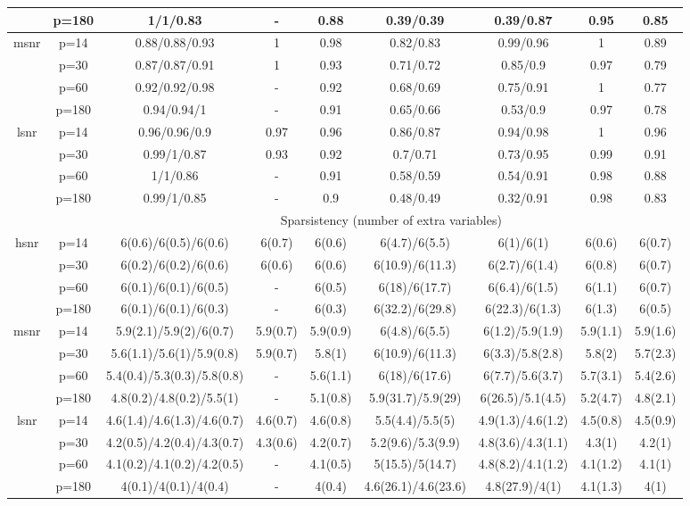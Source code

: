 \begin{table}[ht]
{\begin{tabular}{|c|c|ccccccc|}
   & p=180 & 1/1/0.83 & - & 0.88 & 0.39/0.39 & 0.39/0.87 & 0.95 & 0.85 \\ 
  \midrule\multirow{4}[2]{*}{msnr} & p=14 & 0.88/0.88/0.93 & 1 & 0.98 & 0.82/0.83 & 0.99/0.96 & 1 & 0.89 \\ 
   & p=30 & 0.87/0.87/0.91 & 1 & 0.93 & 0.71/0.72 & 0.85/0.9 & 0.97 & 0.79 \\ 
   & p=60 & 0.92/0.92/0.98 & - & 0.92 & 0.68/0.69 & 0.75/0.91 & 1 & 0.77 \\ 
   & p=180 & 0.94/0.94/1 & - & 0.91 & 0.65/0.66 & 0.53/0.9 & 0.97 & 0.78 \\ 
  \midrule\multirow{4}[2]{*}{lsnr} & p=14 & 0.96/0.96/0.9 & 0.97 & 0.96 & 0.86/0.87 & 0.94/0.98 & 1 & 0.96 \\ 
   & p=30 & 0.99/1/0.87 & 0.93 & 0.92 & 0.7/0.71 & 0.73/0.95 & 0.99 & 0.91 \\ 
   & p=60 & 1/1/0.86 & - & 0.91 & 0.58/0.59 & 0.54/0.91 & 0.98 & 0.88 \\ 
   & p=180 & 0.99/1/0.85 & - & 0.9 & 0.48/0.49 & 0.32/0.91 & 0.98 & 0.83 \\ 
   \midrule 
 \multicolumn{1}{|c}{} &       & \multicolumn{7}{c|}{Sparsistency (number of extra variables)} \\
\midrule\multirow{4}[2]{*}{hsnr} & p=14 & 6(0.6)/6(0.5)/6(0.6) & 6(0.7) & 6(0.6) & 6(4.7)/6(5.5) & 6(1)/6(1) & 6(0.6) & 6(0.7) \\ 
   & p=30 & 6(0.2)/6(0.2)/6(0.6) & 6(0.6) & 6(0.6) & 6(10.9)/6(11.3) & 6(2.7)/6(1.4) & 6(0.8) & 6(0.7) \\ 
   & p=60 & 6(0.1)/6(0.1)/6(0.5) & - & 6(0.5) & 6(18)/6(17.7) & 6(6.4)/6(1.5) & 6(1.1) & 6(0.7) \\ 
   & p=180 & 6(0.1)/6(0.1)/6(0.3) & - & 6(0.3) & 6(32.2)/6(29.8) & 6(22.3)/6(1.3) & 6(1.3) & 6(0.5) \\ 
  \midrule\multirow{4}[2]{*}{msnr} & p=14 & 5.9(2.1)/5.9(2)/6(0.7) & 5.9(0.7) & 5.9(0.9) & 6(4.8)/6(5.5) & 6(1.2)/5.9(1.9) & 5.9(1.1) & 5.9(1.6) \\ 
   & p=30 & 5.6(1.1)/5.6(1)/5.9(0.8) & 5.9(0.7) & 5.8(1) & 6(10.9)/6(11.3) & 6(3.3)/5.8(2.8) & 5.8(2) & 5.7(2.3) \\ 
   & p=60 & 5.4(0.4)/5.3(0.3)/5.8(0.8) & - & 5.6(1.1) & 6(18)/6(17.6) & 6(7.7)/5.6(3.7) & 5.7(3.1) & 5.4(2.6) \\ 
   & p=180 & 4.8(0.2)/4.8(0.2)/5.5(1) & - & 5.1(0.8) & 5.9(31.7)/5.9(29) & 6(26.5)/5.1(4.5) & 5.2(4.7) & 4.8(2.1) \\ 
  \midrule\multirow{4}[2]{*}{lsnr} & p=14 & 4.6(1.4)/4.6(1.3)/4.6(0.7) & 4.6(0.7) & 4.6(0.8) & 5.5(4.4)/5.5(5) & 4.9(1.3)/4.6(1.2) & 4.5(0.8) & 4.5(0.9) \\ 
   & p=30 & 4.2(0.5)/4.2(0.4)/4.3(0.7) & 4.3(0.6) & 4.2(0.7) & 5.2(9.6)/5.3(9.9) & 4.8(3.6)/4.3(1.1) & 4.3(1) & 4.2(1) \\ 
   & p=60 & 4.1(0.2)/4.1(0.2)/4.2(0.5) & - & 4.1(0.5) & 5(15.5)/5(14.7) & 4.8(8.2)/4.1(1.2) & 4.1(1.2) & 4.1(1) \\ 
   & p=180 & 4(0.1)/4(0.1)/4(0.4) & - & 4(0.4) & 4.6(26.1)/4.6(23.6) & 4.8(27.9)/4(1) & 4.1(1.3) & 4(1) \\ 
   \bottomrule 
\end{tabular}
}
\end{table}
